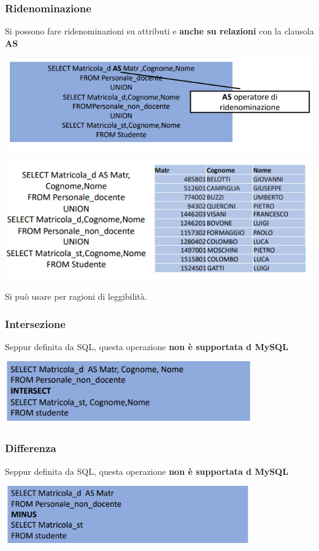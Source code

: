 \documentclass[12pt]{article}
\begin{document}
\subsubsection{Ridenominazione}
Si possono fare ridenominazioni su attributi e \textbf{anche su relazioni} con la clausola \textbf{AS}
\begin{center}
    \includegraphics[width = 1\textwidth]{Images/193.PNG}
\end{center}
\begin{center}
    \includegraphics[width = 1\textwidth]{Images/194.PNG}
\end{center}
Si può usare per ragioni di leggibilità.
\newpage
\subsubsection{Intersezione}
Seppur definita da SQL, questa operazione \textbf{non è supportata d MySQL}
\begin{center}
    \includegraphics[width = 0.80\textwidth]{Images/195.PNG}
\end{center}
\subsubsection{Differenza}
Seppur definita da SQL, questa operazione \textbf{non è supportata d MySQL}
\begin{center}
    \includegraphics[width = 0.80\textwidth]{Images/196.PNG}
\end{center}
\end{document}
